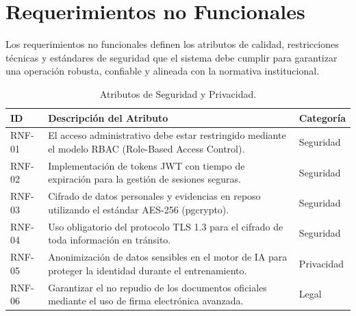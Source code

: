 \section{Requerimientos no Funcionales}

Los requerimientos no funcionales definen los atributos de calidad, restricciones técnicas y estándares de seguridad que el sistema debe cumplir para garantizar una operación robusta, confiable y alineada con la normativa institucional.

\begin{table}[h!]
\centering
\scriptsize
\caption{Atributos de Seguridad y Privacidad.}
\label{tab:rnf_seguridad}
\begin{tabular}{@{} l p{9.5cm} l @{}}
\toprule
\rowcolor[HTML]{2D3E50} 
\textbf{\color[HTML]{FFFFFF} ID} & \textbf{\color[HTML]{FFFFFF} Descripción del Atributo} & \textbf{\color[HTML]{FFFFFF} Categoría} \\ \midrule
RNF-01 & El acceso administrativo debe estar restringido mediante el modelo RBAC (Role-Based Access Control). & Seguridad \\
\rowcolor[HTML]{F2F4F7} 
RNF-02 & Implementación de tokens JWT con tiempo de expiración para la gestión de sesiones seguras. & Seguridad \\
RNF-03 & Cifrado de datos personales y evidencias en reposo utilizando el estándar AES-256 (pgcrypto). & Seguridad \\
\rowcolor[HTML]{F2F4F7} 
RNF-04 & Uso obligatorio del protocolo TLS 1.3 para el cifrado de toda información en tránsito. & Seguridad \\
RNF-05 & Anonimización de datos sensibles en el motor de IA para proteger la identidad durante el entrenamiento. & Privacidad \\
\rowcolor[HTML]{F2F4F7} 
RNF-06 & Garantizar el no repudio de los documentos oficiales mediante el uso de firma electrónica avanzada. & Legal \\ \bottomrule
\end{tabular}
\end{table}

